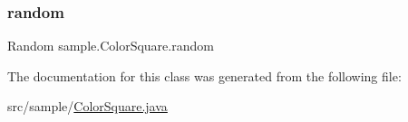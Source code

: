 \mbox{\label{classsample_1_1_color_square_a398146a0cc15168fc6fbe5aac3e9f50b}} 
\subsubsection{\texorpdfstring{random}{random}}
{\footnotesize\ttfamily Random sample.\+Color\+Square.\+random\hspace{0.3cm}{\ttfamily [private]}}



The documentation for this class was generated from the following file\+:\begin{DoxyCompactItemize}
\item 
src/sample/\mbox{\hyperlink{_color_square_8java}{Color\+Square.\+java}}\end{DoxyCompactItemize}
